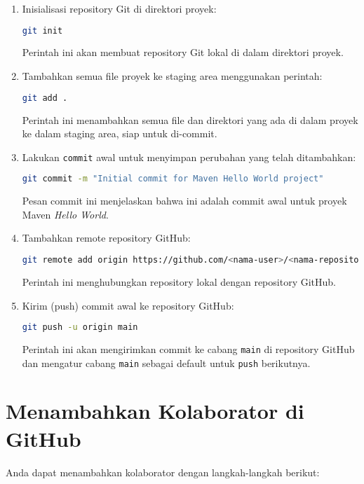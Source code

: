 \begin{enumerate}
	\item Inisialisasi repository Git di direktori proyek:
	\begin{lstlisting}[language=bash]
		git init
	\end{lstlisting}
	Perintah ini akan membuat repository Git lokal di dalam direktori proyek.
	
	\item Tambahkan semua file proyek ke staging area menggunakan perintah:
	\begin{lstlisting}[language=bash]
		git add .
	\end{lstlisting}
	Perintah ini menambahkan semua file dan direktori yang ada di dalam proyek ke dalam staging area, siap untuk di-commit.
	
	\item Lakukan \texttt{commit} awal untuk menyimpan perubahan yang telah ditambahkan:
	\begin{lstlisting}[language=bash]
		git commit -m "Initial commit for Maven Hello World project"
	\end{lstlisting}
	Pesan commit ini menjelaskan bahwa ini adalah commit awal untuk proyek Maven \textit{Hello World}.
	
	\item Tambahkan remote repository GitHub:
	\begin{lstlisting}[language=bash]
		git remote add origin https://github.com/<nama-user>/<nama-repository>.git
	\end{lstlisting}
	Perintah ini menghubungkan repository lokal dengan repository GitHub.
	
	\item Kirim (push) commit awal ke repository GitHub:
	\begin{lstlisting}[language=bash]
		git push -u origin main
	\end{lstlisting}
	Perintah ini akan mengirimkan commit ke cabang \texttt{main} di repository GitHub dan mengatur cabang \texttt{main} sebagai default untuk \texttt{push} berikutnya.
\end{enumerate}

\section{Menambahkan Kolaborator di GitHub}

Anda dapat menambahkan kolaborator dengan langkah-langkah berikut:

